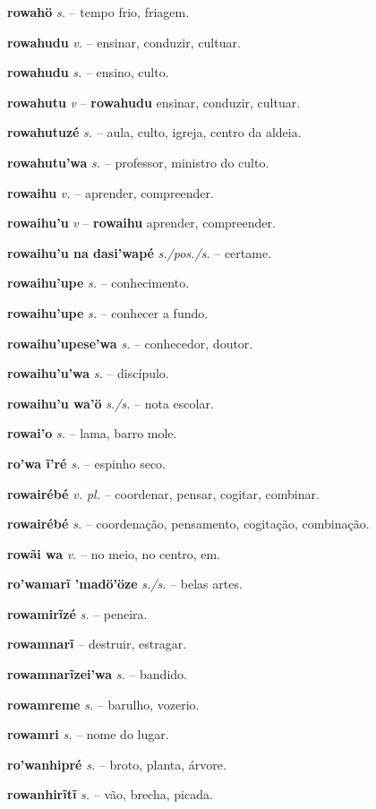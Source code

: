 \textbf{rowahö} \textit{s.} -- tempo frio, friagem.

\textbf{rowahudu} \textit{v.} -- ensinar, conduzir, cultuar.

\textbf{rowahudu} \textit{s.} -- ensino, culto.

\textbf{rowahutu} \textit{v} -- \textbf{rowahudu} ensinar, conduzir, cultuar.

\textbf{rowahutuzé} \textit{s.} -- aula, culto, igreja, centro da aldeia.

\textbf{rowahutu'wa} \textit{s.} -- professor, ministro do culto.

\textbf{rowaihu} \textit{v.} -- aprender, compreender.

\textbf{rowaihu'u} \textit{v} -- \textbf{rowaihu} aprender, compreender.

\textbf{rowaihu'u na dasi'wapé} \textit{s./pos./s.} -- certame.

\textbf{rowaihu'upe} \textit{s.} -- conhecimento.

\textbf{rowaihu'upe} \textit{s.} -- conhecer a fundo.

\textbf{rowaihu'upese'wa} \textit{s.} -- conhecedor, doutor.

\textbf{rowaihu'u'wa} \textit{s.} -- discípulo.

\textbf{rowaihu'u wa'ö} \textit{s./s.} -- nota escolar.

\textbf{rowai'o} \textit{s.} -- lama, barro mole.

\textbf{ro'wa ĩ'ré} \textit{s.} -- espinho seco.

\textbf{rowairébé} \textit{v. pl.} -- coordenar, pensar, cogitar, combinar.

\textbf{rowairébé} \textit{s.} -- coordenação, pensamento, cogitação, combinação.

\textbf{rowãi wa} \textit{v.} -- no meio, no centro, em.

\textbf{ro'wamarĩ 'madö'öze} \textit{s./s.} -- belas artes.

\textbf{rowamirĩzé} \textit{s.} -- peneira.

\textbf{rowamnarĩ} \textit{} -- destruir, estragar.

\textbf{rowamnarĩzei'wa} \textit{s.} -- bandido.

\textbf{rowamreme} \textit{s.} -- barulho, vozerio.

\textbf{rowamri} \textit{s.} -- nome do lugar.

\textbf{ro'wanhipré} \textit{s.} -- broto, planta, árvore.

\textbf{rowanhirĩtĩ} \textit{s.} -- vão, brecha, picada.


